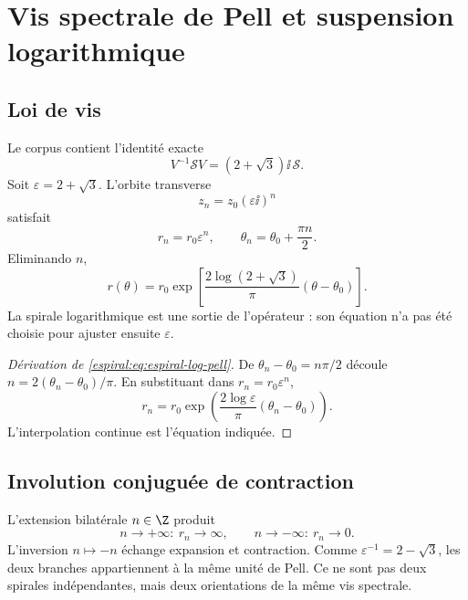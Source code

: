 
\chapter{Vis spectrale de Pell et suspension logarithmique}

\section{Loi de vis}

Le corpus contient l'identité exacte
\begin{equation}
 V^{-1}\mathscr S V=(2+\sqrt3)\ii\,\mathscr S.
 \label{espiral:eq:tornillo-pell}
\end{equation}
Soit \(\varepsilon=2+\sqrt3\). L'orbite transverse
\[
 z_n=z_0(\varepsilon\ii)^n
\]
satisfait
\[
 r_n=r_0\varepsilon^n,
 \qquad
 \theta_n=\theta_0+\frac{\pi n}{2}.
\]
Eliminando \(n\),
\begin{equation}
 r(\theta)=r_0
 \exp\!\left[
 \frac{2\log(2+\sqrt3)}{\pi}
 (\theta-\theta_0)
 \right].
 \label{espiral:eq:espiral-log-pell}
\end{equation}
La spirale logarithmique est une sortie de l'opérateur : son équation n'a pas été choisie pour ajuster ensuite \(\varepsilon\).

\begin{proof}[Dérivation de \cref{espiral:eq:espiral-log-pell}]
De \(\theta_n-\theta_0=n\pi/2\) découle \(n=2(\theta_n-\theta_0)/\pi\). En substituant dans \(r_n=r_0\varepsilon^n\),
\[
 r_n=r_0\exp\left(
 \frac{2\log\varepsilon}{\pi}(\theta_n-\theta_0)
 \right).
\]
L'interpolation continue est l'équation indiquée.
\end{proof}

\section{Involution conjuguée de contraction}

L'extension bilatérale \(n\in\Z\) produit
\[
 n\to+\infty:\ r_n\to\infty,
 \qquad
 n\to-\infty:\ r_n\to0.
\]
L'inversion \(n\mapsto-n\) échange expansion et contraction. Comme \(\varepsilon^{-1}=2-\sqrt3\), les deux branches appartiennent à la même unité de Pell. Ce ne sont pas deux spirales indépendantes, mais deux orientations de la même vis spectrale.

